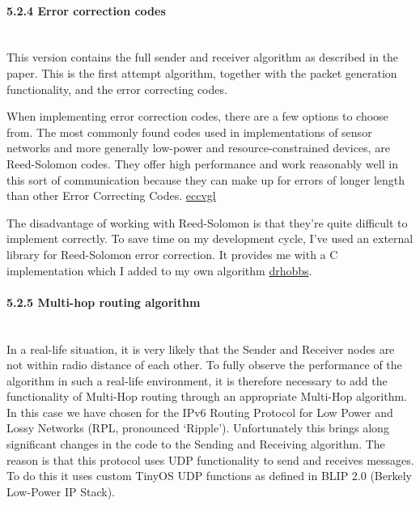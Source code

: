 \paragraph{5.2.4 Error correction
codes\\\\}\label{error-correction-codes}

This version contains the full sender and receiver algorithm as
described in the paper. This is the first attempt algorithm, together
with the packet generation functionality, and the error correcting
codes.

When implementing error correction codes, there are a few options to
choose from. The most commonly found codes used in implementations of
sensor networks and more generally low-power and resource-constrained
devices, are Reed-Solomon codes. They offer high performance and work
reasonably well in this sort of communication because they can make up
for errors of longer length than other Error Correcting Codes.
\href{Resources:\%20FULLTEXT01.pdf\%20aka\%20Performance\%20Evaluation\%20of\%20Error\%20Correcting\%20Techniques\%20for\%20OFDM\%20Systems}{eccvgl}

The disadvantage of working with Reed-Solomon is that they're quite
difficult to implement correctly. To save time on my development cycle,
I've used an external library for Reed-Solomon error correction. It
provides me with a C implementation which I added to my own algorithm
\href{http://www.drdobbs.com/testing/error-correction-with-reed-solomon/240157266}{drhobbs}.

\paragraph{5.2.5 Multi-hop routing
algorithm\\\\}\label{multi-hop-routing-algorithm}

In a real-life situation, it is very likely that the Sender and Receiver
nodes are not within radio distance of each other. To fully observe the
performance of the algorithm in such a real-life environment, it is
therefore necessary to add the functionality of Multi-Hop routing
through an appropriate Multi-Hop algorithm. In this case we have chosen
for the IPv6 Routing Protocol for Low Power and Lossy Networks (RPL,
pronounced `Ripple'). Unfortunately this brings along significant
changes in the code to the Sending and Receiving algorithm. The reason
is that this protocol uses UDP functionality to send and receives
messages. To do this it uses custom TinyOS UDP functions as defined in
BLIP 2.0 (Berkely Low-Power IP Stack).

